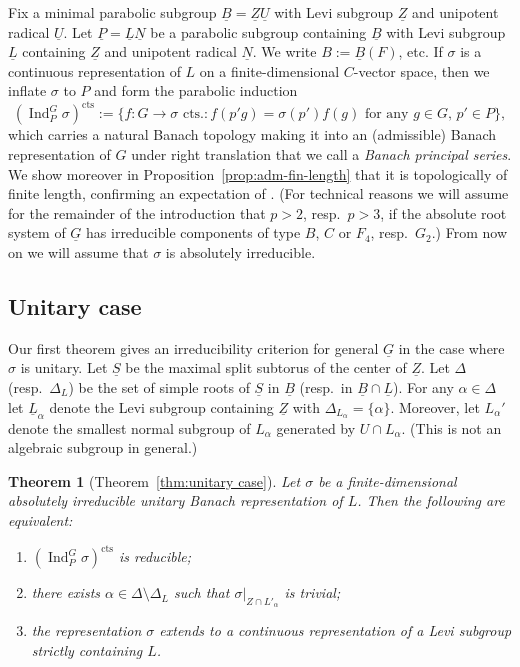 \documentclass[a4paper]{amsart}
\numberwithin{equation}{section}
\newtheorem{thm}{Theorem}[section]
\theoremstyle{remark}
\theoremstyle{definition}
\DeclareMathOperator{\Ind}{Ind}
\newcommand{\alggrp}[1]{\underline{#1}}
\newcommand{\cts}{\mathrm{cts}}
\begin{document}
Fix a minimal parabolic subgroup $\alggrp B = \alggrp Z \alggrp U$ with Levi subgroup $\alggrp Z$ and unipotent radical $\alggrp U$.
Let $\alggrp P = \alggrp L \alggrp N$ be a parabolic subgroup containing $\alggrp B$ with Levi subgroup $\alggrp L$ containing $\alggrp Z$ and unipotent radical $\alggrp N$.
We write $B := \alggrp B(F)$, etc.
If $\sigma$ is a continuous representation of $L$ on a finite-dimensional $C$-vector space, then we inflate $\sigma$ to $P$ and form the parabolic induction
\begin{equation*}
  (\Ind_P^G \sigma)^\cts := \{ \text{$f\colon G\to \sigma$ cts.} : \text{$f(p'g) = \sigma(p')f(g)$ for any $g\in G$, $p'\in P$} \},
\end{equation*}
which carries a natural Banach topology making it into an (admissible) Banach representation of $G$ under right translation that we call a \emph{Banach principal series}.
We show moreover in Proposition~\ref{prop:adm-fin-length} that it is topologically of finite length, confirming an expectation of \cite[\S2]{MR2275644}.
(For technical reasons we will assume for the remainder of the introduction that $p > 2$, resp.\ $p > 3$, if the absolute root system of $\alggrp{G}$ has irreducible components of type $B$, $C$ or $F_{4}$, resp.\ $G_{2}$.)
From now on we will assume that $\sigma$ is absolutely irreducible.

\subsection{Unitary case}
\label{sec:unitary-case-intro}

Our first theorem gives an irreducibility criterion for general $\alggrp G$ in the case where $\sigma$ is unitary.
Let $\alggrp S$ be the maximal split subtorus of the center of $\alggrp Z$.
Let $\Delta$ (resp.\ $\Delta_L$) be the set of simple roots of $\alggrp S$ in $\alggrp B$ (resp.\ in $\alggrp B \cap \alggrp L$).
For any $\alpha \in \Delta$ let $\alggrp L_\alpha$ denote the Levi subgroup containing $\alggrp Z$ with $\Delta_{L_\alpha} = \{\alpha\}$.
Moreover, let $L_\alpha'$ denote the smallest normal subgroup of $L_\alpha$ generated by $U\cap L_{\alpha}$.
(This is not an algebraic subgroup in general.)

\begin{thm}[Theorem~\ref{thm:unitary case}]\label{thm:unitary case-parab-intro}
Let $\sigma$ be a finite-dimensional absolutely irreducible unitary Banach representation of $L$.
Then the following are equivalent:
\begin{enumerate}
\item $(\Ind_{P}^{G}\sigma)^{\cts}$ is reducible;
\item there exists $\alpha \in \Delta \setminus \Delta_L$ such that $\sigma|_{Z \cap L'_{\alpha}}$ is trivial;
\item the representation $\sigma$ extends to a continuous representation of a Levi subgroup strictly containing $L$.
\end{enumerate}
\end{thm}
\end{document}
